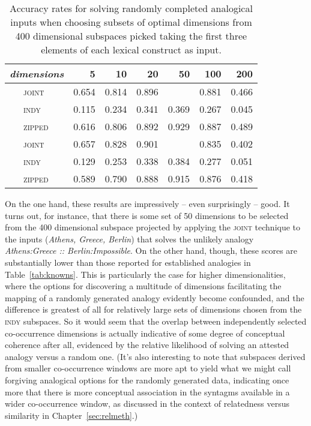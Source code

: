 \begin{table}
\centering
\begin{tabular}{clrrrrrr}
\hline
\multicolumn{2}{l}{\emph{dimensions}} & 5 & 10 & 20 & 50 & 100 & 200 \\
\hline
\parbox[t]{2mm}{} & \textsc{joint} & 0.654 & 0.814 & 0.896 &  & 0.881 & 0.466 \\
& \textsc{indy} & 0.115 & 0.234 & 0.341 & 0.369 & 0.267 & 0.045 \\
& \textsc{zipped} & 0.616 & 0.806 & 0.892 & 0.929 & 0.887 & 0.489 \\
\hline
\parbox[t]{2mm}{} & \textsc{joint} & 0.657 & 0.828 & 0.901 &  & 0.835 & 0.402 \\
& \textsc{indy} & 0.129 & 0.253 & 0.338 & 0.384 & 0.277 & 0.051 \\
& \textsc{zipped} & 0.589 & 0.790 & 0.888 & 0.915 & 0.876 & 0.418 \\
\hline
\end{tabular}
\caption[Finding Spaces for Fake Analogies]{Accuracy rates for solving randomly completed analogical inputs when choosing subsets of optimal dimensions from 400 dimensional subspaces picked taking the first three elements of each lexical construct as input.}
\label{tab:fakes}
\end{table}

On the one hand, these results are impressively -- even surprisingly -- good.  It turns out, for instance, that there is some set of 50 dimensions to be selected from the 400 dimensional subspace projected by applying the \textsc{joint} technique to the inputs (\emph{Athens, Greece, Berlin}) that solves the unlikely analogy \emph{Athens:Greece :: Berlin:Impossible}.  On the other hand, though, these scores are substantially lower than those reported for established analogies in Table~\ref{tab:knowns}.  This is particularly the case for higher dimensionalities, where the options for discovering a multitude of dimensions facilitating the mapping of a randomly generated analogy evidently become confounded, and the difference is greatest of all for relatively large sets of dimensions chosen from the \textsc{indy} subspaces.  So it would seem that the overlap between independently selected co-occurrence dimensions is actually indicative of some degree of conceptual coherence after all, evidenced by the relative likelihood of solving an attested analogy versus a random one.  (It's also interesting to note that subspaces derived from smaller co-occurrence windows are more apt to yield what we might call forgiving analogical options for the randomly generated data, indicating once more that there is more conceptual association in the syntagms available in a wider co-occurrence window, as discussed in the context of relatedness versus similarity in Chapter~\ref{sec:relmeth}.)

